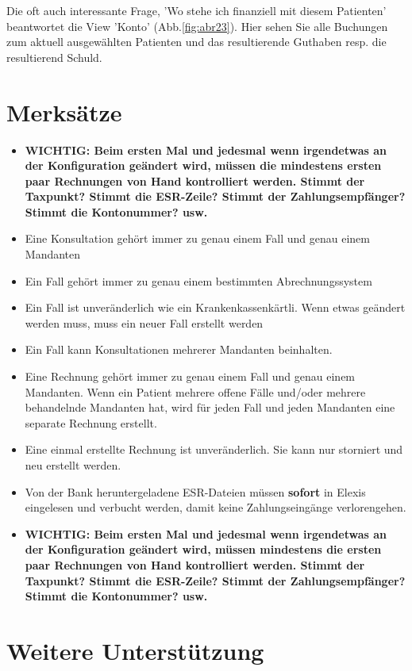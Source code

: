 \documentclass[a4paper]{scrartcl}
\begin{document}
Die oft auch interessante Frage, 'Wo stehe ich finanziell mit diesem Patienten' beantwortet die View 'Konto' (Abb.\ref{fig:abr23}). Hier sehen Sie alle Buchungen zum aktuell ausgewählten Patienten und das resultierende Guthaben resp. die resultierend Schuld.


\section{Merksätze}
\begin{itemize}
\item \textbf{WICHTIG: Beim ersten Mal und jedesmal wenn irgendetwas an der Konfiguration geändert wird, müssen die mindestens ersten paar Rechnungen von Hand kontrolliert werden. Stimmt der Taxpunkt? Stimmt die ESR-Zeile? Stimmt der Zahlungsempfänger? Stimmt die Kontonummer? usw.}
\item Eine Konsultation gehört immer zu genau einem Fall und genau einem Mandanten
\item Ein Fall gehört immer zu genau einem bestimmten Abrechnungssystem
\item Ein Fall ist unveränderlich wie ein Krankenkassenkärtli. Wenn etwas geändert werden muss, muss ein neuer Fall erstellt werden
\item Ein Fall kann Konsultationen mehrerer Mandanten beinhalten.
\item Eine Rechnung gehört immer zu genau einem Fall und genau einem Mandanten. Wenn ein Patient mehrere offene Fälle und/oder mehrere behandelnde Mandanten hat, wird für jeden Fall und jeden Mandanten eine separate Rechnung erstellt.
\item Eine einmal erstellte Rechnung ist unveränderlich. Sie kann nur storniert und neu erstellt werden.
\item Von der Bank heruntergeladene ESR-Dateien müssen \textbf{sofort} in Elexis eingelesen und verbucht werden, damit keine Zahlungseingänge verlorengehen.
\item \textbf{WICHTIG: Beim ersten Mal und jedesmal wenn irgendetwas an der Konfiguration geändert wird, müssen mindestens die ersten paar Rechnungen von Hand kontrolliert werden. Stimmt der Taxpunkt? Stimmt die ESR-Zeile? Stimmt der Zahlungsempfänger? Stimmt die Kontonummer? usw.}

\end{itemize}

\section{Weitere Unterstützung}
\end{document}

